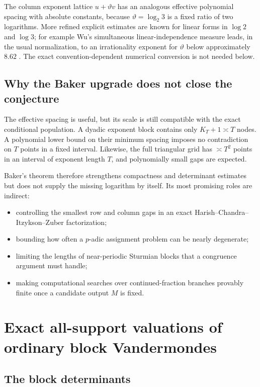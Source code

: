 \documentclass[11pt,oneside]{article}
\theoremstyle{definition}
\theoremstyle{remark}
\begin{document}
The column exponent lattice $u+\vartheta v$ has an analogous effective polynomial spacing
with absolute constants, because $\vartheta=\log_2 3$ is a fixed ratio of two logarithms.
More refined explicit estimates are known for linear forms in $\log2$ and $\log3$; for
example Wu's simultaneous linear-independence measure leads, in the usual normalization, to
an irrationality exponent for $\vartheta$ below approximately $8.62$
\cite{Wu2003}.  The exact convention-dependent numerical conversion is not needed below.

\subsection{Why the Baker upgrade does not close the conjecture}

The effective spacing is useful, but its scale is still compatible with the exact conditional
population.  A dyadic exponent block contains only $K_T+1\asymp T$ nodes.  A polynomial lower
bound on their minimum spacing imposes no contradiction on $T$ points in a fixed interval.
Likewise, the full triangular grid has $\asymp T^2$ points in an interval of exponent length
$T$, and polynomially small gaps are expected.

Baker's theorem therefore strengthens compactness and determinant estimates but does not
supply the missing logarithm by itself.  Its most promising roles are indirect:

\begin{itemize}
\item controlling the smallest row and column gaps in an exact Harish--Chandra--Itzykson--Zuber
      factorization;
\item bounding how often a $p$-adic assignment problem can be nearly degenerate;
\item limiting the lengths of near-periodic Sturmian blocks that a congruence argument must
      handle;
\item making computational searches over continued-fraction branches provably finite once a
      candidate output $M$ is fixed.
\end{itemize}

\section{Exact all-support valuations of ordinary block Vandermondes}

\subsection{The block determinants}
\end{document}
